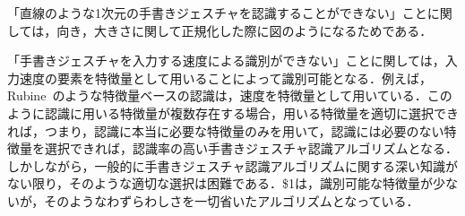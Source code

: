 「直線のような1次元の手書きジェスチャを認識することができない」ことに関しては，向き，大きさに関して正規化した際に図のようになるためである．

「手書きジェスチャを入力する速度による識別ができない」ことに関しては，入力速度の要素を特徴量として用いることによって識別可能となる．例えば，Rubine~\cite{Rubine:1991:SGE:122718.122753}のような特徴量ベースの認識は，速度を特徴量として用いている．このように認識に用いる特徴量が複数存在する場合，用いる特徴量を適切に選択できれば，つまり，認識に本当に必要な特徴量のみを用いて，認識には必要のない特徴量を選択できれば，認識率の高い手書きジェスチャ認識アルゴリズムとなる．しかしながら，一般的に手書きジェスチャ認識アルゴリズムに関する深い知識がない限り，そのような適切な選択は困難である．\$1は，識別可能な特徴量が少ないが，そのようなわずらわしさを一切省いたアルゴリズムとなっている．



